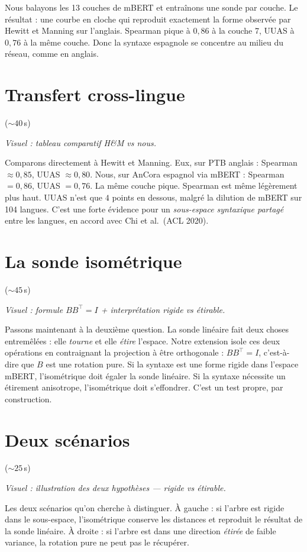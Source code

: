 \documentclass[11pt]{article}
\newcommand{\visuel}[1]{%
  {\footnotesize\color{midgray}\textit{Visuel : #1}\par\vspace{0.3em}}}
\newcommand{\duree}[1]{\hfill{\footnotesize\color{midgray}(${\sim}#1$\,s)}}
\newcommand{\mbert}{m\textsc{BERT}\xspace}
\begin{document}
Nous balayons les 13 couches de \mbert{} et entraînons une sonde par
couche. Le résultat : une courbe en cloche qui reproduit exactement
la forme observée par Hewitt et Manning sur l'anglais. Spearman
pique à $0{,}86$ à la couche 7, UUAS à $0{,}76$ à la même couche.
Donc la syntaxe espagnole se concentre au milieu du réseau, comme
en anglais.

\section{Transfert cross-lingue} \duree{40}
\visuel{tableau comparatif H\&M vs nous.}

Comparons directement à Hewitt et Manning. Eux, sur PTB anglais :
Spearman ${\approx} 0{,}85$, UUAS ${\approx} 0{,}80$. Nous, sur
AnCora espagnol via \mbert{} : Spearman $= 0{,}86$, UUAS $= 0{,}76$.
La même couche pique. Spearman est même légèrement plus haut. UUAS
n'est que $4$ points en dessous, malgré la dilution de \mbert{} sur
104 langues. C'est une forte évidence pour un \emph{sous-espace
syntaxique partagé} entre les langues, en accord avec Chi et al.\
(ACL 2020).

\section{La sonde isométrique} \duree{45}
\visuel{formule $B B^\top = I$ + interprétation rigide vs étirable.}

Passons maintenant à la deuxième question. La sonde linéaire fait
deux choses entremêlées : elle \emph{tourne} et elle \emph{étire}
l'espace. Notre extension isole ces deux opérations en contraignant
la projection à être orthogonale : $B B^\top = I$, c'est-à-dire que
$B$ est une rotation pure. Si la syntaxe est une forme rigide dans
l'espace \mbert{}, l'isométrique doit égaler la sonde linéaire. Si
la syntaxe nécessite un étirement anisotrope, l'isométrique doit
s'effondrer. C'est un test propre, par construction.

\section{Deux scénarios} \duree{25}
\visuel{illustration des deux hypothèses --- rigide vs étirable.}

Les deux scénarios qu'on cherche à distinguer. À gauche : si l'arbre
est rigide dans le sous-espace, l'isométrique conserve les distances
et reproduit le résultat de la sonde linéaire. À droite : si l'arbre
est dans une direction \emph{étirée} de faible variance, la rotation
pure ne peut pas le récupérer.
\end{document}
